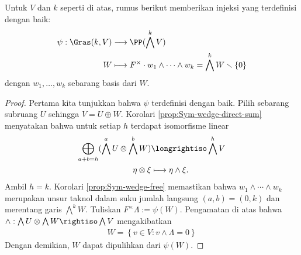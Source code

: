 \begin{definition-theorem} 
	Untuk $V$ dan $k$ seperti di atas, rumus berikut memberikan injeksi yang terdefinisi dengan baik:
	\begin{align*}
		\psi: \Gras(k,V) & \longrightarrow \PP( \bigwedge^k V) \\
		W & \longmapsto F^\times \cdot w_1 \wedge \cdots \wedge w_k = \bigwedge^k W \smallsetminus \{0\}
	\end{align*}
	dengan $w_1, \ldots, w_k$ sebarang basis dari $W$.
\end{definition-theorem}
\begin{proof}
	Pertama kita tunjukkan bahwa $\psi$ terdefinisi dengan baik. Pilih sebarang subruang $U$ sehingga $V = U \oplus W$. Korolari \ref{prop:Sym-wedge-direct-sum} menyatakan bahwa untuk setiap $h$ terdapat isomorfisme linear
	\begin{align*}
		\bigoplus_{a+b=h} (\bigwedge^a U \otimes \bigwedge^b W) & \longrightiso \bigwedge^h V \\
		\eta \otimes \xi & \longmapsto \eta \wedge \xi.
	\end{align*}
	Ambil $h=k$. Korolari \ref{prop:Sym-wedge-free} memastikan bahwa $w_1 \wedge \cdots \wedge w_k$ merupakan unsur taknol dalam suku jumlah langsung $(a,b)=(0,k)$ dan merentang garis $\bigwedge^k W$. Tuliskan $F^\times \Lambda := \psi(W)$. Pengamatan di atas bahwa $\wedge: \bigwedge U \otimes \bigwedge W \rightiso \bigwedge V$ mengakibatkan
	\begin{gather}\label{eqn:Plucker-recovery}
		W = \left\{ v \in V : v \wedge \Lambda = 0 \right\}
	\end{gather}
	Dengan demikian, $W$ dapat dipulihkan dari $\psi(W)$.
\end{proof}

